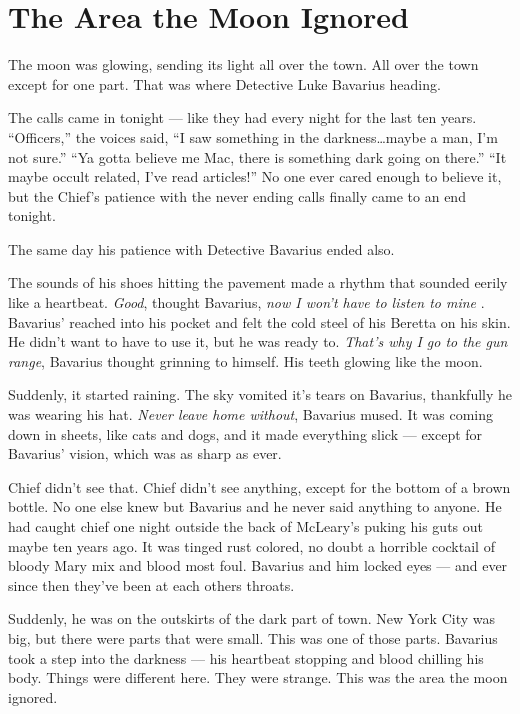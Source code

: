 \chapter{The Area the Moon Ignored}



The moon was glowing, sending its light all over the town. All over
the town except for one part. That was where Detective Luke
Bavarius heading.



The calls came in tonight --- like they had every night for the
last ten years. ``Officers,'' the voices said, ``I
saw something in the darkness{\ldots}maybe a man, I'm not sure.''
``Ya gotta believe me Mac, there is something dark going on
there.'' ``It maybe occult related, I've read
articles!'' No one ever cared enough to believe it, but the
Chief's patience with the never ending calls finally came to an end
tonight.



The same day his patience with Detective Bavarius ended also.



The sounds of his shoes hitting the pavement made a rhythm that
sounded eerily like a heartbeat. {\em Good}, thought Bavarius,
{\em now I won't have to listen to mine} . Bavarius' reached into
his pocket and felt the cold steel of his Beretta on his skin. He
didn't want to have to use it, but he was ready to. {\em That's why I
go to the gun range}, Bavarius thought grinning to himself. His
teeth glowing like the moon.



Suddenly, it started raining. The sky vomited it's tears on
Bavarius, thankfully he was wearing his hat. {\em Never leave home
without}, Bavarius mused. It was coming down in sheets, like
cats and dogs, and it made everything slick --- except for
Bavarius' vision, which was as sharp as ever.



Chief didn't see that. Chief didn't see anything, except for the
bottom of a brown bottle. No one else knew but Bavarius and he
never said anything to anyone. He had caught chief one night
outside the back of McLeary's puking his guts out maybe ten years
ago. It was tinged rust colored, no doubt a horrible cocktail of
bloody Mary mix and blood most foul. Bavarius and him locked eyes
--- and ever since then they've been at each others
throats.



Suddenly, he was on the outskirts of the dark part of town. New
York City was big, but there were parts that were small. This was
one of those parts. Bavarius took a step into the darkness ---
his heartbeat stopping and blood chilling his body. Things were
different here. They were strange. This was the area the moon
ignored.



